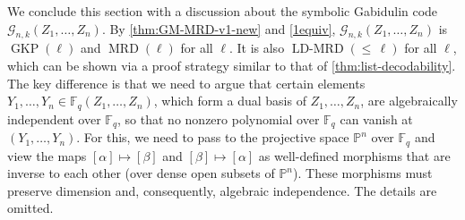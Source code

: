 \documentclass[11pt]{article}
\theoremstyle{plain}
\theoremstyle{definition}
\theoremstyle{remark}
\newcommand{\ldmrd}[1]{\operatorname{LD-MRD}({\leq}\,#1)}
\newcommand{\F}{\mathbb{F}}
\def \mG {\mathcal{G}}
\begin{document}
We conclude this section with a discussion about the symbolic Gabidulin code $\mG_{n,k}(Z_1,\dots, Z_n)$.
By \cref{thm:GM-MRD-v1-new} and \cref{1equiv}, $\mG_{n,k}(Z_1,\dots, Z_n)$ is $\operatorname{GKP}(\ell)$ and $\operatorname{MRD}(\ell)$ for all $\ell$.
It is also $\ldmrd{\ell}$ for all $\ell$, which can be shown via a proof strategy similar to that of \cref{thm:list-decodability}.
The key difference is that we need to argue that certain elements $Y_1,\dots,Y_n\in\F_q(Z_1,\dots,Z_n)$, which form a dual basis of $Z_1,\dots,Z_n$, are algebraically independent over $\F_q$, so that no nonzero polynomial over $\F_q$ can vanish at $(Y_1,\dots,Y_n)$. For this, we need to pass to the projective space $\mathbb{P}^n$ over $\F_q$ and view the maps $[\alpha]\mapsto [\beta]$ and $[\beta]\mapsto [\alpha]$ as well-defined morphisms that are inverse to each other (over dense open subsets of $\mathbb{P}^n$). 
These morphisms must preserve dimension and, consequently, algebraic independence. The details are omitted.
\end{document}
